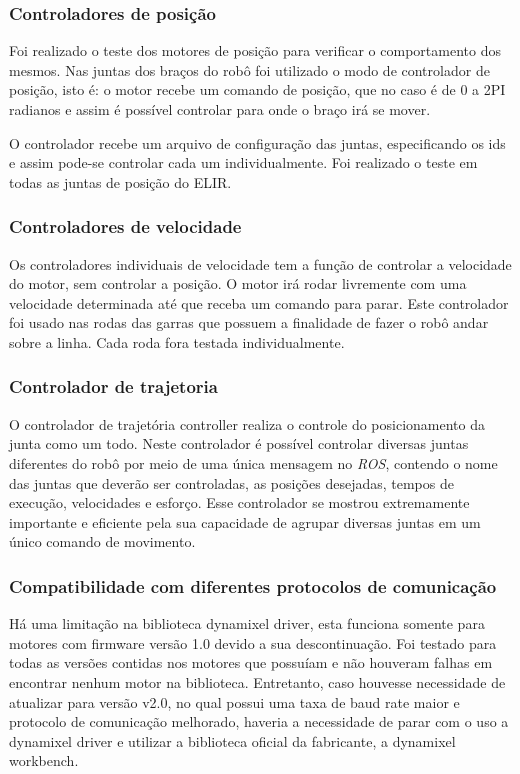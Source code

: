 \subsubsection{Controladores de posição}
Foi realizado o teste dos motores de posição para verificar o comportamento dos mesmos. Nas juntas dos braços do robô foi utilizado o modo de controlador de posição, isto é: o motor recebe um comando de posição, que no caso é de 0 a 2PI radianos e assim é possível controlar para  onde o braço irá se mover.
 
O controlador recebe um arquivo de configuração das juntas, especificando os ids e assim pode-se controlar cada um individualmente. Foi realizado o teste em todas as juntas de posição do ELIR.

\subsubsection{Controladores de velocidade}
Os controladores individuais de velocidade tem a função de controlar a velocidade do motor, sem controlar a posição. O motor irá rodar livremente com uma velocidade determinada até que receba um comando para parar. Este controlador foi usado nas rodas das garras que possuem a finalidade de fazer o robô andar sobre a linha. Cada roda fora testada individualmente.

\subsubsection{Controlador de trajetoria}
O controlador de trajetória controller realiza o controle do posicionamento da junta como um todo. Neste controlador é possível controlar diversas juntas diferentes do robô por meio de uma única mensagem no \textit{ROS}, contendo o nome das juntas que deverão ser controladas, as posições desejadas, tempos de execução, velocidades e esforço. Esse controlador se mostrou extremamente importante e eficiente pela sua capacidade de agrupar diversas juntas em um único comando de movimento. 

\subsubsection{Compatibilidade com diferentes protocolos de comunicação}
Há uma limitação na biblioteca dynamixel driver, esta funciona somente para motores com firmware versão 1.0 devido a sua descontinuação. Foi testado para todas as versões contidas nos motores que possuíam e não houveram falhas em encontrar nenhum motor na biblioteca. Entretanto, caso houvesse necessidade de atualizar para versão v2.0, no qual possui uma taxa de baud rate maior e protocolo de comunicação melhorado, haveria a necessidade de parar com o uso a dynamixel driver e utilizar a biblioteca oficial da fabricante, a dynamixel workbench.

